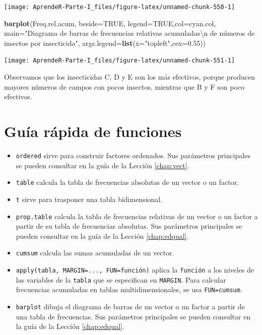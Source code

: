 \documentclass[]{book}
\newenvironment{Shaded}{\begin{snugshade}}{\end{snugshade}}
\newcommand{\CharTok}[1]{\textcolor[rgb]{0.31,0.60,0.02}{#1}}
\newcommand{\DataTypeTok}[1]{\textcolor[rgb]{0.13,0.29,0.53}{#1}}
\newcommand{\FloatTok}[1]{\textcolor[rgb]{0.00,0.00,0.81}{#1}}
\newcommand{\KeywordTok}[1]{\textcolor[rgb]{0.13,0.29,0.53}{\textbf{#1}}}
\newcommand{\NormalTok}[1]{#1}
\newcommand{\OtherTok}[1]{\textcolor[rgb]{0.56,0.35,0.01}{#1}}
\newcommand{\StringTok}[1]{\textcolor[rgb]{0.31,0.60,0.02}{#1}}
\theoremstyle{definition}
\theoremstyle{definition}
\theoremstyle{definition}
\theoremstyle{remark}
\begin{document}
\begin{center}\texttt{[image: AprendeR-Parte-I\_files/figure-latex/unnamed-chunk-550-1]} \end{center}

\begin{Shaded}
\begin{Highlighting}[]
\KeywordTok{barplot}\NormalTok{(Freq.rel.acum, }\DataTypeTok{beside=}\OtherTok{TRUE}\NormalTok{, }\DataTypeTok{legend=}\OtherTok{TRUE}\NormalTok{,}\DataTypeTok{col=}\NormalTok{cyan.col, }
  \DataTypeTok{main=}\StringTok{"Diagrama de barras de frecuencias relativas acumuladas}\CharTok{\textbackslash{}n}\StringTok{ de números de insectos por insecticida"}\NormalTok{, }
  \DataTypeTok{args.legend=}\KeywordTok{list}\NormalTok{(}\DataTypeTok{x=}\StringTok{"topleft"}\NormalTok{,}\DataTypeTok{cex=}\FloatTok{0.55}\NormalTok{))}
\end{Highlighting}
\end{Shaded}

\begin{center}\texttt{[image: AprendeR-Parte-I\_files/figure-latex/unnamed-chunk-551-1]} \end{center}

Observamos que los insecticidas C, D y E son los más efectivos, porque producen mayores números de campos con pocos insectos, mientras que B y F son poco efectivos.

\hypertarget{guia-rapida-de-funciones-5}{%
\section{Guía rápida de funciones}\label{guia-rapida-de-funciones-5}}

\begin{itemize}
\item
  \texttt{ordered} sirve para construir factores ordenados. Sus parámetros principales se pueden consultar en la guía de la Lección \ref{chap:vect}.
\item
  \texttt{table} calcula la tabla de frecuencias absolutas de un vector o un factor.
\item
  \texttt{t} sirve para trasponer una tabla bidimensional.
\item
  \texttt{prop.table} calcula la tabla de frecuencias relativas de un vector o un factor a partir de su tabla de frecuencias absolutas. Sus parámetros principales se pueden consultar en la guía de la Lección \ref{chap:edqual}.
\item
  \texttt{cumsum} calcula las sumas acumuladas de un vector.
\item
  \texttt{apply(tabla,\ MARGIN=...,\ FUN=función)} aplica la \texttt{función} a
  los niveles de las variables de la \texttt{tabla} que se especifican en \texttt{MARGIN}. Para calcular frecuencias acumuladas en tablas multidimensionales, se usa \texttt{FUN=cumsum}.
\item
  \texttt{barplot} dibuja el diagrama de barras de un vector o un factor a partir de una tabla de frecuencias. Sus parámetros principales se pueden consultar en la guía de la Lección \ref{chap:edqual}.
\end{itemize}
\end{document}
